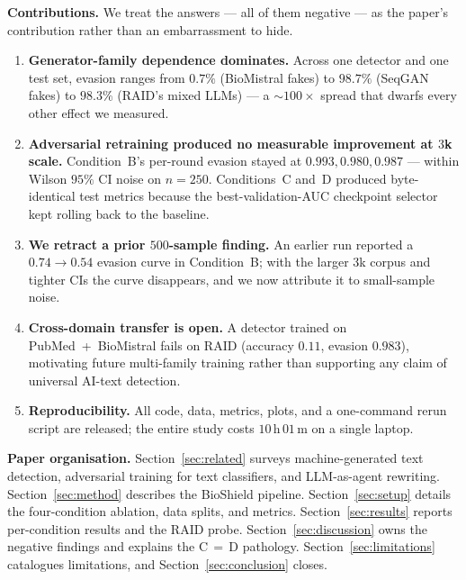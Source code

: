 \documentclass[conference]{IEEEtran}
\begin{document}
\textbf{Contributions.} We treat the answers — all of them negative — as the
paper's contribution rather than an embarrassment to hide.
\begin{enumerate}[leftmargin=*]
\item \textbf{Generator-family dependence dominates.} Across one detector
  and one test set, evasion ranges from \(0.7\%\) (BioMistral fakes) to
  \(98.7\%\) (SeqGAN fakes) to \(98.3\%\) (RAID's mixed LLMs) — a
  \(\sim\!100\times\) spread that dwarfs every other effect we measured.
\item \textbf{Adversarial retraining produced no measurable improvement at
  \(3\)k scale.} Condition~B's per-round evasion stayed at
  \(0.993, 0.980, 0.987\) — within Wilson \(95\%\) CI noise on \(n=250\).
  Conditions~C and~D produced byte-identical test metrics because the
  best-validation-AUC checkpoint selector kept rolling back to the
  baseline.
\item \textbf{We retract a prior \(500\)-sample finding.} An earlier run
  reported a \(0.74 \to 0.54\) evasion curve in Condition~B; with the
  larger \(3\)k corpus and tighter CIs the curve disappears, and we now
  attribute it to small-sample noise.
\item \textbf{Cross-domain transfer is open.} A detector trained on
  PubMed~+~BioMistral fails on RAID (accuracy \(0.11\), evasion \(0.983\)),
  motivating future multi-family training rather than supporting any claim
  of universal AI-text detection.
\item \textbf{Reproducibility.} All code, data, metrics, plots, and a
  one-command rerun script are released; the entire study costs
  \(10\,\mathrm{h}\,01\,\mathrm{m}\) on a single laptop.
\end{enumerate}

\textbf{Paper organisation.} Section~\ref{sec:related} surveys
machine-generated text detection, adversarial training for text classifiers,
and LLM-as-agent rewriting. Section~\ref{sec:method} describes the BioShield
pipeline. Section~\ref{sec:setup} details the four-condition ablation, data
splits, and metrics. Section~\ref{sec:results} reports per-condition results
and the RAID probe. Section~\ref{sec:discussion} owns the negative findings
and explains the C\,$=$\,D pathology. Section~\ref{sec:limitations}
catalogues limitations, and Section~\ref{sec:conclusion} closes.

\end{document}
